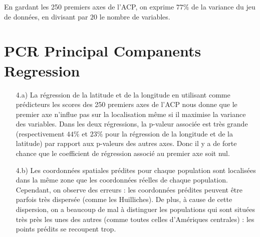 \documentclass[a4paper, 12pt]{article}
\begin{document}
\begin{enumerate}
 En gardant les 250 premiers axes de l'ACP, on exprime $77 \%$ de la variance du jeu de données, en divisant par $20$ le nombre de variables.

\end{enumerate}

\section{PCR Principal Companents Regression}

\begin{enumerate}
\setlength{\itemsep}{12pt}

\item[4.a)]
La régression de la latitude et de la longitude en utilisant comme prédicteurs les scores des 250 premiers axes de l'ACP nous donne que le premier axe n'influe pas sur la localisation même si il maximise la variance des variables. Dans les deux régressions, la p-valeur associée est très grande (respectivement $44\%$ et $23\%$ pour la régression de la longitude et de la latitude) par rapport aux p-valeurs des autres axes. Donc il y a de forte chance que le coefficient de régression associé au premier axe soit nul. 

\item[4.b)] 
Les coordonnées spatiales prédites pour chaque population sont localisées dans la même zone que les coordonnées réelles de chaque population. Cependant, on observe des erreurs : les coordonnées prédites peuvent être parfois très dispersée (comme les Huilliches). De plus, à cause de cette dispersion, on a beaucoup de mal à distinguer les populations qui sont situées très près les unes des autres (comme toutes celles d'Amériques centrales) : les points prédits se recoupent trop.


\end{enumerate}
\end{document}
